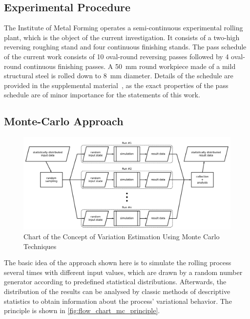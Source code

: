 \subsection{Experimental Procedure}\label{subsec:experimental-procedure}

The Institute of Metal Forming operates a semi-continuous experimental rolling plant, which is the object of the current investigation.
It consists of a two-high reversing roughing stand and four continuous finishing stands.
The pass schedule of the current work consists of 10 oval-round reversing passes followed by 4 oval-round continuous finishing passes.
A \qty{50}{\milli\meter} round workpiece made of a mild structural steel is rolled down to \qty{8}{\milli\meter} diameter.
Details of the schedule are provided in the supplemental material~\cite{esaform2023_weiner_supp}, as the exact properties of the pass schedule are of minor importance for the statements of this work.

\subsection{Monte-Carlo Approach}\label{subsec:monte-carlo-approach}

\begin{figure}
    \centering
    \includegraphics[width=\linewidth]{img/flow_chart_mc_principle}
    \caption{Chart of the Concept of Variation Estimation Using Monte Carlo Techniques}
    \label{fig:flow_chart_mc_principle}
\end{figure}

The basic idea of the approach shown here is to simulate the rolling process several times with different input values, which are drawn by a random number generator according to predefined statistical distributions.
Afterwards, the distribution of the results can be analysed by classic methods of descriptive statistics to obtain information about the process' variational behavior.
The principle is shown in \autoref{fig:flow_chart_mc_principle}.

